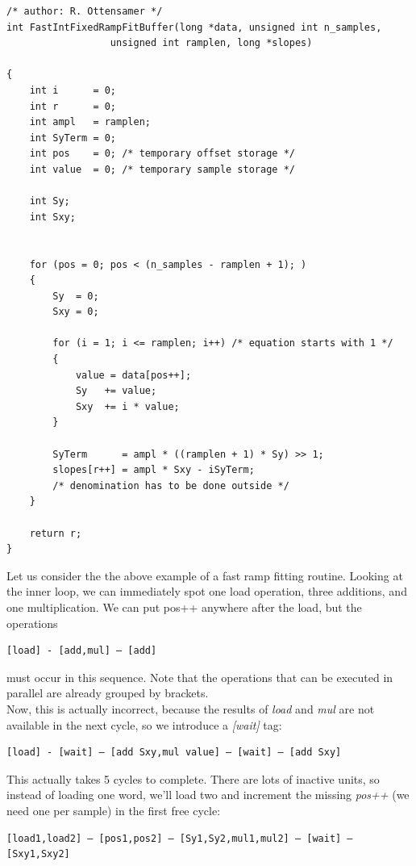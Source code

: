 \begin{minipage}{\linewidth}
\begin{lstlisting}
/* author: R. Ottensamer */
int FastIntFixedRampFitBuffer(long *data, unsigned int n_samples,
			      unsigned int ramplen, long *slopes)

{
	int i      = 0;
	int r      = 0;	
	int ampl   = ramplen;
	int SyTerm = 0;
	int pos    = 0; /* temporary offset storage */
	int value  = 0; /* temporary sample storage */

	int Sy;
	int Sxy;


	for (pos = 0; pos < (n_samples - ramplen + 1); )
	{
		Sy  = 0;
		Sxy = 0;

		for (i = 1; i <= ramplen; i++) /* equation starts with 1 */
		{
			value = data[pos++];
			Sy   += value;
			Sxy  += i * value;
		}

		SyTerm      = ampl * ((ramplen + 1) * Sy) >> 1;
		slopes[r++] = ampl * Sxy - iSyTerm;
		/* denomination has to be done outside */
	}

	return r;
}
\end{lstlisting}
\end{minipage}

\noindent
Let us consider the the above example of a fast ramp fitting routine. Looking
at the inner loop, we can immediately spot one load operation, three additions,
and one multiplication.  We can put pos++ anywhere after the load, but the
operations

\begin{lstlisting}
[load] - [add,mul] – [add]
\end{lstlisting}

\noindent must occur in this sequence. Note that the operations that can be
executed in parallel are already grouped by brackets. \\

\noindent Now, this is actually incorrect, because the results of \emph{load}
and \emph{mul} are not available in the next cycle, so we introduce a
\emph{[wait]} tag:

\begin{lstlisting}
[load] - [wait] – [add Sxy,mul value] – [wait] – [add Sxy]
\end{lstlisting}

\noindent
This actually takes 5 cycles to complete. There are lots of inactive
units, so instead of loading one word, we'll load two and increment the missing
\emph{pos++} (we need one per sample) in the first free cycle:

\begin{lstlisting}
[load1,load2] – [pos1,pos2] – [Sy1,Sy2,mul1,mul2] – [wait] – [Sxy1,Sxy2]
\end{lstlisting}

